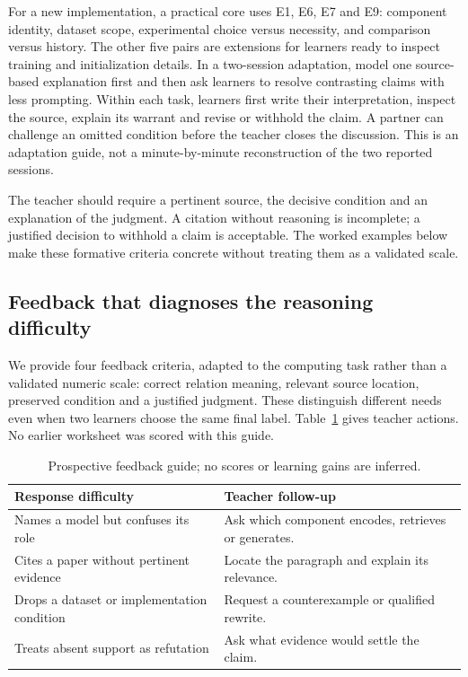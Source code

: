 For a new implementation, a practical core uses E1, E6, E7 and E9: component identity, dataset scope, experimental choice versus necessity, and comparison versus history. The other five pairs are extensions for learners ready to inspect training and initialization details. In a two-session adaptation, model one source-based explanation first and then ask learners to resolve contrasting claims with less prompting. Within each task, learners first write their interpretation, inspect the source, explain its warrant and revise or withhold the claim. A partner can challenge an omitted condition before the teacher closes the discussion. This is an adaptation guide, not a minute-by-minute reconstruction of the two reported sessions.

The teacher should require a pertinent source, the decisive condition and an explanation of the judgment. A citation without reasoning is incomplete; a justified decision to withhold a claim is acceptable. The worked examples below make these formative criteria concrete without treating them as a validated scale.

\subsection{Feedback that diagnoses the reasoning difficulty}
We provide four feedback criteria, adapted to the computing task rather than a validated numeric scale: correct relation meaning, relevant source location, preserved condition and a justified judgment. These distinguish different needs even when two learners choose the same final label. Table~\ref{tab:feedbackguide} gives teacher actions. No earlier worksheet was scored with this guide.

\begin{table}[t]
\caption{Prospective feedback guide; no scores or learning gains are inferred.}
\label{tab:feedbackguide}
\begin{tabular}{@{}p{}p{}@{}}
\toprule
Response difficulty & Teacher follow-up\\
\midrule
Names a model but confuses its role & Ask which component encodes, retrieves or generates.\\
Cites a paper without pertinent evidence & Locate the paragraph and explain its relevance.\\
Drops a dataset or implementation condition & Request a counterexample or qualified rewrite.\\
Treats absent support as refutation & Ask what evidence would settle the claim.\\
\bottomrule
\end{tabular}
\end{table}


